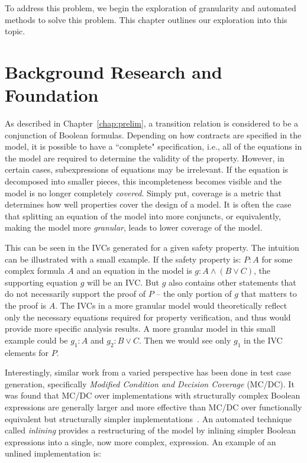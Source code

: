 To address this problem, we begin the exploration of granularity and automated methods to solve this problem. This chapter outlines our exploration into this topic. 

\section{Background Research and Foundation}
As described in Chapter~\ref{chap:prelim}, a transition relation is considered to be a conjunction of Boolean formulas. Depending on how contracts are specified in the model, it is possible to have a ``complete" specification, i.e., all of the equations in the model are required to determine the validity of the property. However, in certain cases, subexpressions of equations may be irrelevant. If the equation is decomposed into smaller pieces, this incompleteness becomes visible and the model is no longer completely {\em covered}. Simply put, coverage is a metric that determines how well properties cover the design of a model. It is often the case that splitting an equation of the model into more conjuncts, or equivalently, making the model more \textit{granular}, leads to lower coverage of the model. 

This can be seen in the IVCs generated for a given safety property. The intuition can be illustrated with a small example. If the safety property is: $P : A $ for some complex formula $A$ and an equation in the model is $g: A \land (B \lor C)$, the supporting equation $g$ will be an IVC. But $g$ also contains other statements that do not necessarily support the proof of $P$ -- the only portion of $g$ that matters to the proof is $A$. The IVCs in a more granular model would theoretically reflect only the necessary equations required for property verification, and thus would provide more specific analysis results. A more granular model in this small example could be $g_1 : A$ and $g_2: B \lor C$. Then we would see only $g_1$ in the IVC elements for $P$. 

Interestingly, similar work from a varied perspective has been done in test case generation, specifically \emph{Modified Condition and Decision Coverage} (MC/DC). It was found that MC/DC over implementations with structurally complex Boolean expressions are generally larger and more effective than MC/DC over functionally equivalent but structurally simpler implementations~\cite{gay2016effect}. An automated technique called \emph{inlining} provides a restructuring of the model by inlining simpler Boolean expressions into a single, now more complex, expression. An example of an unlined implementation is: 

